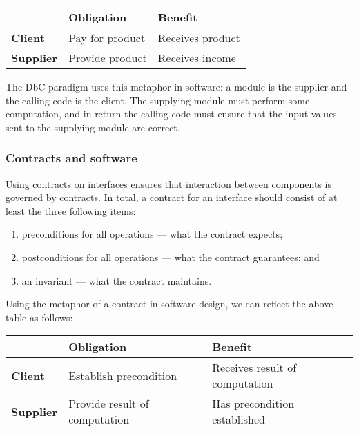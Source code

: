\begin{center}
\begin{tabular}{lll}
\toprule
   & \textbf{Obligation} & \textbf{Benefit}\\
\midrule
 \textbf{Client} & Pay for product & Receives product \\
 \textbf{Supplier}  & Provide product & Receives income\\
\bottomrule
\end{tabular}
\end{center}

The DbC paradigm uses this metaphor in software: a module is the supplier and the calling code is the client. The supplying module must perform some computation, and in return the calling code must ensure that the input values sent to the supplying module are correct.

\subsubsection{Contracts and software}

Using contracts on interfaces ensures that interaction between components is governed by contracts. In total, a contract for an interface should consist of at least the  three following items:

\begin{enumerate}

 \item preconditions for all operations --- what the contract expects;

 \item postconditions for all operations --- what the contract guarantees; and

 \item an invariant --- what the contract maintains.

\end{enumerate}


Using the metaphor of a contract in software design, we can reflect the above table as follows:

\begin{center}
\begin{tabular}{lll}
\toprule
   & \textbf{Obligation} & \textbf{Benefit}\\
\midrule
 \textbf{Client} & Establish precondition & Receives result of computation \\
 \textbf{Supplier}  & Provide result of computation & Has precondition established\\
\bottomrule
\end{tabular}
\end{center}

